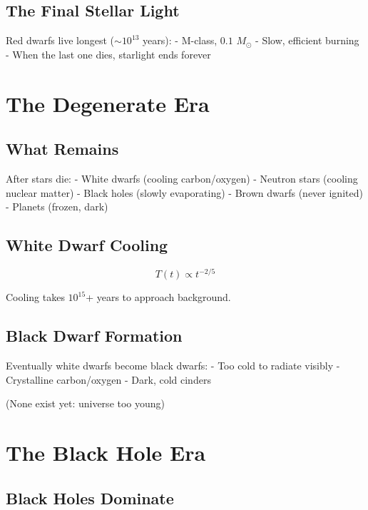 \documentclass[
  11pt,
  letterpaper,
  twoside,
  openright]{book}
\begin{document}
\subsection{The Final Stellar Light}\label{the-final-stellar-light}

Red dwarfs live longest (\(\sim 10^{13}\) years): - M-class, \(0.1\)
\(M_\odot\) - Slow, efficient burning - When the last one dies,
starlight ends forever

\section{The Degenerate Era}\label{the-degenerate-era}

\subsection{What Remains}\label{what-remains}

After stars die: - White dwarfs (cooling carbon/oxygen) - Neutron stars
(cooling nuclear matter) - Black holes (slowly evaporating) - Brown
dwarfs (never ignited) - Planets (frozen, dark)

\subsection{White Dwarf Cooling}\label{white-dwarf-cooling-1}

\[
T(t) \propto t^{-2/5}
\]

Cooling takes \(10^{15}\)+ years to approach background.

\subsection{Black Dwarf Formation}\label{black-dwarf-formation}

Eventually white dwarfs become black dwarfs: - Too cold to radiate
visibly - Crystalline carbon/oxygen - Dark, cold cinders

(None exist yet: universe too young)

\section{The Black Hole Era}\label{the-black-hole-era}

\subsection{Black Holes Dominate}\label{black-holes-dominate}
\end{document}
